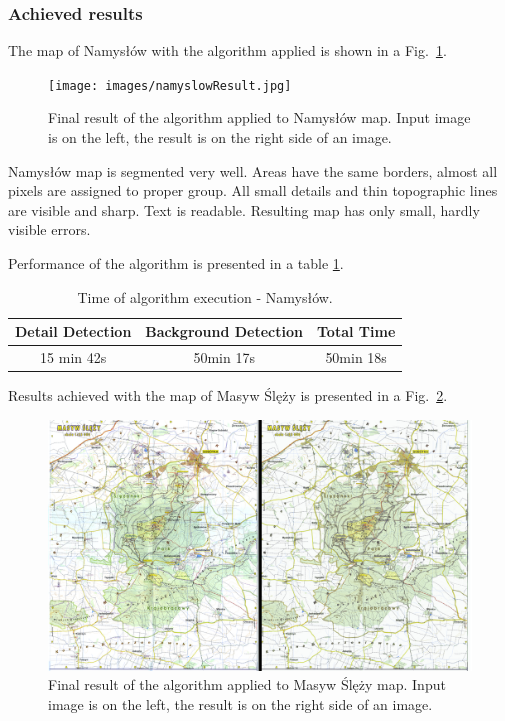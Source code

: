 \documentclass[a4paper,onecolumn,oneside,12pt]{memoir}
\begin{document}
\subsubsection{Achieved results}

The map of Namysłów with the algorithm applied is shown in a Fig.~\ref{namyslowResult}.

\begin{figure}[!ht]
\begin{center}
\texttt{[image: images/namyslowResult.jpg]}
\caption{Final result of the algorithm applied to Namysłów map. Input image is on the left, the
result is on the right side of an image.}
\label{namyslowResult}
\end{center}
\end{figure}

Namysłów map is segmented very well. Areas have the same borders, almost all pixels are assigned
to proper group. All small details and thin topographic lines are visible and sharp. Text is
readable. Resulting map has only small, hardly visible errors.

Performance of the algorithm is presented in a table \ref{namyslowPerformance}.

\begin{table}[!ht]
\begin{center}
\caption{Time of algorithm execution - Namysłów.}
\label{namyslowPerformance}
\begin{tabular}{|c|c|c|}
  \hline
  Detail Detection & Background Detection & Total Time \\
  \hline
  15 min 42s & 50min 17s & 50min 18s \\
  \hline
\end{tabular}
\end{center}
\end{table}

Results achieved with the map of Masyw Ślęży is presented in a Fig.~\ref{masywSlezyResult}.

\begin{figure}[!ht]
\begin{center}
\includegraphics[scale=0.8]{images/masywSlezyResult.png}
\caption{Final result of the algorithm applied to Masyw Ślęży map. Input image is on the left, the
result is on the right side of an image.}
\label{masywSlezyResult}
\end{center}
\end{figure}
\end{document}
